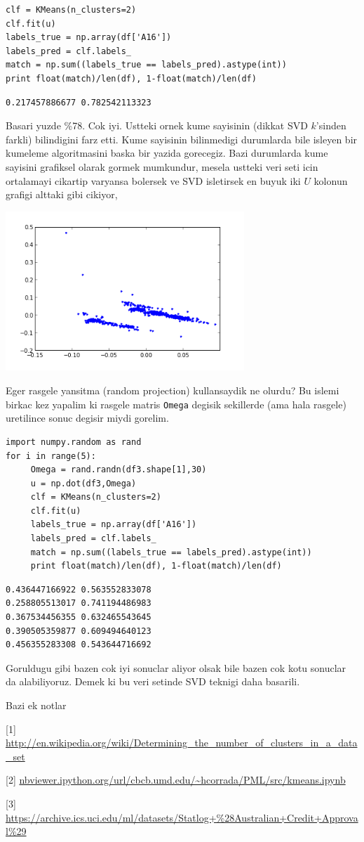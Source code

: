 \documentclass[12pt,fleqn]{article}\usepackage{../common}
\begin{document}
\begin{verbatim}
clf = KMeans(n_clusters=2)
clf.fit(u)
labels_true = np.array(df['A16'])
labels_pred = clf.labels_
match = np.sum((labels_true == labels_pred).astype(int))
print float(match)/len(df), 1-float(match)/len(df)
\end{verbatim}

\begin{verbatim}
0.217457886677 0.782542113323
\end{verbatim}

Basari yuzde \%78. Cok iyi. Ustteki ornek kume sayisinin (dikkat SVD
$k$'sinden farkli) bilindigini farz etti. Kume sayisinin bilinmedigi
durumlarda bile isleyen bir kumeleme algoritmasini baska bir yazida
gorecegiz. Bazi durumlarda kume sayisini grafiksel olarak gormek mumkundur,
mesela ustteki veri seti icin ortalamayi cikartip varyansa bolersek ve SVD
isletirsek en buyuk iki $U$ kolonun grafigi alttaki gibi cikiyor, 

\includegraphics[height=6cm]{kmeans_4.png}

Eger rasgele yansitma (random projection) kullansaydik ne olurdu? Bu islemi
birkac kez yapalim ki rasgele matris \verb!Omega! degisik sekillerde (ama
hala rasgele) uretilince sonuc degisir miydi gorelim.

\begin{verbatim}
import numpy.random as rand
for i in range(5):
     Omega = rand.randn(df3.shape[1],30)
     u = np.dot(df3,Omega)
     clf = KMeans(n_clusters=2)
     clf.fit(u)
     labels_true = np.array(df['A16'])
     labels_pred = clf.labels_
     match = np.sum((labels_true == labels_pred).astype(int))
     print float(match)/len(df), 1-float(match)/len(df)
\end{verbatim}

\begin{verbatim}
0.436447166922 0.563552833078
0.258805513017 0.741194486983
0.367534456355 0.632465543645
0.390505359877 0.609494640123
0.456355283308 0.543644716692
\end{verbatim}

Goruldugu gibi bazen cok iyi sonuclar aliyor olsak bile bazen cok kotu
sonuclar da alabiliyoruz. Demek ki bu veri setinde SVD teknigi daha
basarili. 


Bazi ek notlar

[1] \url{http://en.wikipedia.org/wiki/Determining_the_number_of_clusters_in_a_data_set}

[2] \url{nbviewer.ipython.org/url/cbcb.umd.edu/~hcorrada/PML/src/kmeans.ipynb}

[3] \url{https://archive.ics.uci.edu/ml/datasets/Statlog+%28Australian+Credit+Approval%29}
\end{document}
